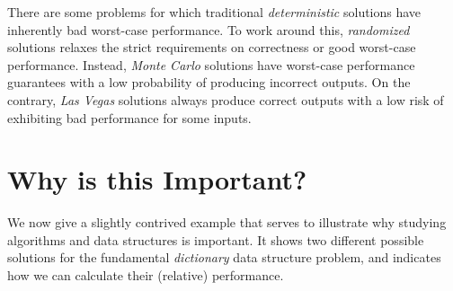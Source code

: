 There are some problems for which traditional \emph{deterministic} solutions have inherently bad worst-case performance. To work around this, \emph{randomized} solutions relaxes the strict requirements on correctness or good worst-case performance. Instead, \emph{Monte Carlo} solutions have worst-case performance guarantees with a low probability of producing incorrect outputs. On the contrary, \emph{Las Vegas} solutions always produce correct outputs with a low risk of exhibiting bad performance for some inputs.

\section{Why is this Important?}
We now give a slightly contrived example that serves to illustrate why studying algorithms and data structures is important. It shows two different possible solutions for the fundamental \emph{dictionary} data structure problem, and indicates how we can calculate their (relative) performance. 

